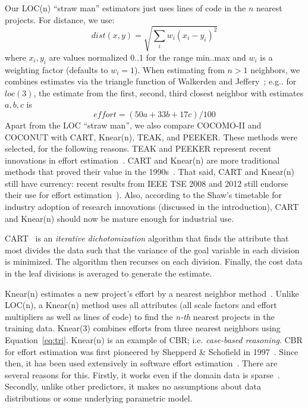 \documentclass{sig-alternate}
\begin{document}
Our LOC(n) ``straw man'' 
estimators just uses  lines of code
in the $n$ nearest projects. For distance,
we use:
\begin{equation}\label{eq:dist}
\mathit{dist}(x,y) = \sqrt{\sum_i w_i (x_i-y_i)^2}
\end{equation} 
where $x_i,y_i$ 
are values normalized 0..1 for the range min..max
and $w_i$ is a weighting factor (defaults to $w_i=1$).
When  estimating from $n>1$ neighbors,
we combines estimates via the triangle 
function of  Walkerden
and Jeffery~\cite{Walkerden1999}; 
e.g.. for $loc(3)$, the  estimate
from the first, second, third closest neighbor with estimates
$a,b,c$ is 
\begin{equation}\label{eq:tri}
\mathit{effort} = (50a + 33b + 17c)/100
\end{equation}
Apart from the LOC ``straw man'',
we also compare COCOMO-II and COCONUT with CART,
Knear(n), TEAK, and PEEKER. 
These  methods were  selected, for the following reasons.
TEAK  and PEEKER   represent   recent innovations in effort
estimation~\cite{koc11b,papa13}.  
CART and Knear(n) are more traditional methods  that proved their value  in the 1990s~\cite{shepperd97,Walkerden1999}. That said, CART and Knear(n)
still have currency: 
recent results from IEEE TSE 2008 and 2012 still endorse their  use for effort estimation~\cite{dejaeger12,koc11a,keung2008b}).
Also, according to the Shaw's timetable for industry adoption of research innovations
(discussed in the introduction),  CART and Knear(n) should now be mature enough for industrial use.


CART~\cite{breiman84} is an {\em iterative dichotomization} algorithm
that finds the attribute that most divides the data such that
the variance of the goal variable in each division is minimized.
The algorithm then recurses on each division. 
Finally, the cost data in the leaf divisions
is averaged to generate the estimate. 


Knear(n) estimates a new project's effort
by a nearest neighbor  method~\cite{shepperd97}. Unlike LOC(n),
a Knear(n) method uses all attributes
(all scale factors and effort multipliers as well as lines of code)
to find the {\em n-th} nearest projects in the training data. 
Knear(3) combines efforts from three nearest neighbors using
Equation~\ref{eq:tri}.
Knear(n) is an example of CBR; i.e.  {\em case-based reasoning}.
CBR for effort estimation was 
first pioneered by Shepperd \& Schofield
in 1997~\cite{shepperd97}.
  Since then, it 
has been used extensively in software effort
estimation~\cite{Auer2006,Walkerden1999,%
  Kirsopp2002,shepperd97,kadoda00,Li2008,Li2006,Li2007,Li2009a,
  keung2008a,keung2008b,keung2008c}.  
There are several reasons  for this. Firstly, 
it works even if the domain data is sparse~\cite{Myrtveit}.
Secondly, 
unlike other predictors, it makes no assumptions about data
distributions or some  underlying parametric model. 
\end{document}
